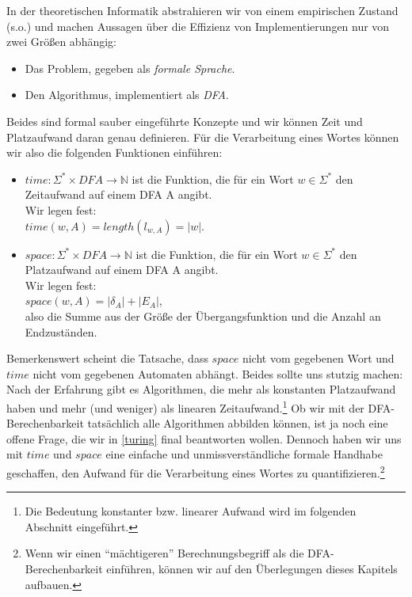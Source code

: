 In der theoretischen Informatik abstrahieren wir von einem empirischen Zustand (s.o.)
und machen Aussagen über die Effizienz von Implementierungen nur von zwei Größen abhängig:
\begin{itemize}
    \item Das Problem, gegeben als \emph{formale Sprache}.
    \item Den Algorithmus, implementiert als \emph{DFA}.
\end{itemize}
Beides sind formal sauber eingeführte Konzepte
und wir können Zeit und Platzaufwand daran genau definieren.
Für die Verarbeitung eines Wortes können wir also die folgenden Funktionen einführen:
\begin{itemize}
    \item $time: \Sigma^* \times DFA \rightarrow \mathbb{N}$ ist die Funktion,
        die für ein Wort $w \in \Sigma^*$ den Zeitaufwand auf einem DFA A angibt.\\
        Wir legen fest:\\
        $time(w,A) =  length(l_{w,A}) = |w|$.
    \item $space: \Sigma^* \times DFA \rightarrow \mathbb{N}$ ist die Funktion,
        die für ein Wort $w  \in \Sigma^*$ den Platzaufwand auf einem DFA A angibt.\\
        Wir legen fest:\\
        $space(w,A) = |\delta_A| + |E_A|$,\\
        also die Summe aus der Größe der Übergangsfunktion und die Anzahl an Endzuständen.
\end{itemize}

Bemerkenswert scheint die Tatsache, dass $space$ nicht vom gegebenen Wort 
und $time$ nicht vom gegebenen Automaten abhängt.
Beides sollte uns stutzig machen:
Nach der Erfahrung gibt es Algorithmen, die mehr als konstanten Platzaufwand haben
und mehr (und weniger) als linearen Zeitaufwand.\footnote{
    Die Bedeutung konstanter bzw. linearer Aufwand wird im folgenden Abschnitt eingeführt.}
Ob wir mit der DFA-Berechenbarkeit tatsächlich alle Algorithmen abbilden können,
ist ja noch eine offene Frage, die wir in \autoref{turing} final beantworten wollen.
Dennoch haben wir uns mit $time$ und $space$
eine einfache und unmissverständliche formale Handhabe geschaffen,
den Aufwand für die Verarbeitung eines Wortes zu quantifizieren.\footnote{
Wenn wir einen ``mächtigeren'' Berechnungsbegriff als die DFA-Berechenbarkeit einführen,
können wir auf den Überlegungen dieses Kapitels aufbauen.}


